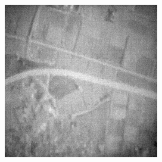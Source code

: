 \begin{figure}
\begin{subfigure}[b]{0.19\textwidth}
    \end{subfigure}
    \hfill
    \begin{subfigure}[b]{0.19\textwidth}
        \centering
        \includegraphics[width=\textwidth]{../figs/outputs/mono/605.png}
    \end{subfigure}      
    

\end{figure}
